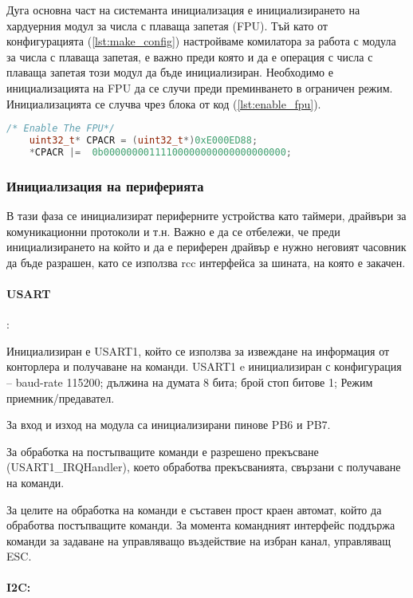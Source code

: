 Дуга основна част на системанта инициализация е инициализирането на хардуерния модул за числа с плаваща запетая (FPU).
Тъй като от конфигурацията (\autoref{lst:make_config}) настройваме комилатора за работа с модула за числа с плаваща запетая, е важно
преди която и да е операция с числа с плаваща запетая този модул да бъде инициализиран.
Необходимо е инициализацията на FPU да се случи преди преминването в ограничен режим.
Инициализацията се случва чрез блока от код (\autoref{lst:enable_fpu}).
\begin{lstlisting}[language=c, caption={Инициализация на модула за числа с плаваща запетая}, label={lst:enable_fpu}]
    /* Enable The FPU*/
    uint32_t* CPACR = (uint32_t*)0xE000ED88;
    *CPACR |=  0b00000000111100000000000000000000;
\end{lstlisting}

\subsubsection{Инициализация на периферията}

В тази фаза се инициализират периферните устройства като таймери, драйвъри за комуникационни протоколи и т.н.
Важно е да се отбележи, че преди инициализирането на който и да е периферен драйвър е нужно неговият часовник да бъде разрашен,
като се използва rcc интерфейса за шината, на която е закачен.

\paragraph{USART}:

Инициализиран е USART1, 
който се използва за извеждане на информация от 
конторлера и получаване на команди.
USART1 e инициализиран с конфигурация -- 
baud-rate 115200; 
дължина на думата 8 бита;
брой стоп битове 1;
Режим приемник/предавател.

За вход и изход на модула са инициализирани пинове PB6 и PB7.

За обработка на постъпващите команди е разрешено прекъсване (USART1\_IRQHandler),
което обработва прекъсванията, свързани с получаване на команди.

За целите на обработка на команди е съставен прост краен автомат, който 
да обработва постъпващите команди.
За момента командният интерфейс поддържа команди за задаване на
управляващо въздействие на избран канал, управляващ ESC.

\paragraph{I2C:}

